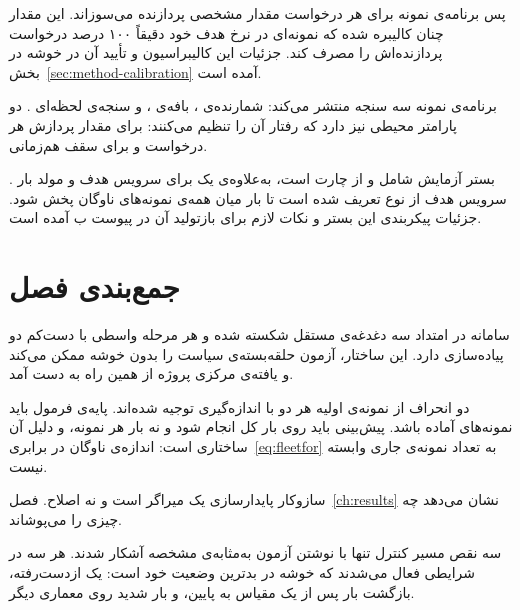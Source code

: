 پس برنامه‌ی نمونه برای هر درخواست مقدار مشخصی پردازنده می‌سوزاند. این مقدار چنان کالیبره شده
که نمونه‌ای در نرخ هدف خود دقیقاً ۱۰۰ درصد درخواست پردازنده‌اش را مصرف کند. جزئیات این
کالیبراسیون و تأیید آن در خوشه در بخش~\ref{sec:method-calibration} آمده است.

برنامه‌ی نمونه سه سنجه منتشر می‌کند: شمارنده‌ی ، بافه‌ی
، و سنجه‌ی لحظه‌ای .
دو پارامتر محیطی نیز دارد که رفتار آن را تنظیم می‌کنند:  برای مقدار
پردازش هر درخواست و  برای سقف هم‌زمانی.

بستر آزمایش شامل  و  از چارت  است،
به‌علاوه‌ی یک  برای سرویس هدف و مولد بار . سرویس هدف از نوع
 تعریف شده است تا بار میان همه‌ی نمونه‌های ناوگان پخش شود. جزئیات
پیکربندی این بستر و نکات لازم برای بازتولید آن در پیوست ب آمده است.

\section{جمع‌بندی فصل}
\label{sec:design-summary}

سامانه در امتداد سه دغدغه‌ی مستقل شکسته شده و هر مرحله واسطی با دست‌کم دو پیاده‌سازی دارد.
این ساختار، آزمون حلقه‌بسته‌ی سیاست را بدون خوشه ممکن می‌کند و یافته‌ی مرکزی پروژه از همین
راه به دست آمد.

دو انحراف از نمونه‌ی اولیه هر دو با اندازه‌گیری توجیه شده‌اند. پایه‌ی فرمول باید نمونه‌های
آماده باشد. پیش‌بینی باید روی بار کل انجام شود و نه بار هر نمونه، و دلیل آن ساختاری است:
اندازه‌ی ناوگان در برابری~\ref{eq:fleetfor} به تعداد نمونه‌ی جاری وابسته نیست.

سازوکار پایدارسازی یک میراگر است و نه اصلاح. فصل~\ref{ch:results} نشان می‌دهد چه چیزی را
می‌پوشاند.

سه نقص مسیر کنترل تنها با نوشتن آزمون به‌مثابه‌ی مشخصه آشکار شدند. هر سه در شرایطی فعال
می‌شدند که خوشه در بدترین وضعیت خود است: یک  ازدست‌رفته، بازگشت بار پس از یک
مقیاس به پایین، و بار شدید روی معماری دیگر.
